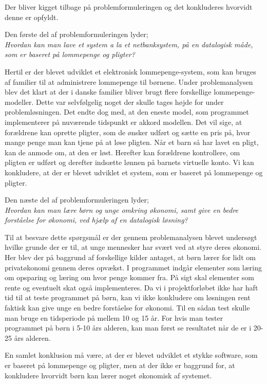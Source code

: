 Der bliver kigget tilbage på problemformuleringen og det konkluderes hvorvidt denne er opfyldt.  

Den første del af problemformuleringen lyder;\\
\textit{Hvordan kan man lave et system a la et netbanksystem, på en datalogisk måde, som er baseret på lommepenge og pligter?}

Hertil er der blevet udviklet et elektronisk lommepenge-system, som kan bruges af familier til at administrere lommepenge til børnene. Under problemanalysen blev det klart at der i danske familier bliver brugt flere forskellige lommepenge-modeller. Dette var selvfølgelig noget der skulle tages højde for under problemløsningen. Det endte dog med, at den eneste model, som programmet implementerer på nuværende tidspunkt er akkord modellen. Det vil sige, at forældrene kan oprette pligter, som de ønsker udført og sætte en pris på, hvor mange penge man kan tjene på at løse pligten. Når et barn så har lavet en pligt, kan de anmode om, at den er løst. Herefter kan forældrene kontrollere, om pligten er udført og derefter indsætte lønnen på barnets virtuelle konto. Vi kan konkludere, at der er blevet udviklet et system, som er baseret på lommepenge og pligter.

Den næste del af problemformuleringen lyder;\\
\textit{Hvordan kan man lære børn og unge omkring økonomi, samt give en bedre forståelse for økonomi, ved hjælp af en datalogisk løsning?}

Til at besvare dette spørgsmål er der gennem problemanalysen blevet undersøgt hvilke grunde der er til, at unge mennesker har svært ved at styre deres økonomi. Her blev der på baggrund af forskellige kilder antaget, at børn lærer for lidt om privatøkonomi gennem deres opvækst. 
I programmet indgår elementer som læring om opsparing og læring om hvor penge kommer fra. På sigt skal elementer som rente og eventuelt skat også implementeres. Da vi i projektforløbet ikke har haft tid til at teste programmet på børn, kan vi ikke konkludere om løsningen rent faktisk kan give unge en bedre forståelse for økonomi. Til en sådan test skulle man bruge en tidsperiode på mellem 10 og 15 år. For hvis man tester programmet på børn i 5-10 års alderen, kan man først se resultatet når de er i 20-25 års alderen.

En samlet konklusion må være, at der er blevet udviklet et stykke software, som er baseret på lommepenge og pligter, men at der ikke er baggrund for, at konkludere hvorvidt børn kan lærer noget økonomisk af systemet.
